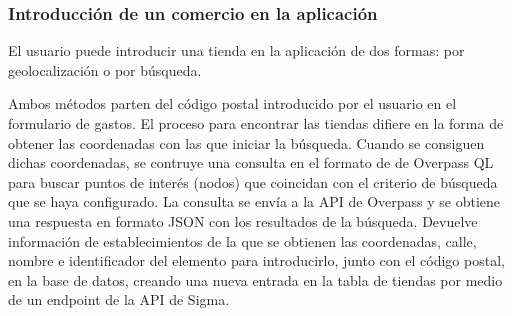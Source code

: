 \subsubsection{Introducción de un comercio en la aplicación}
El usuario puede introducir una tienda en la aplicación de dos formas: por geolocalización o por búsqueda.

Ambos métodos parten del código postal introducido por el usuario en el formulario de gastos. El proceso para encontrar las tiendas difiere en la forma de obtener las coordenadas con las que iniciar la búsqueda. Cuando se consiguen dichas coordenadas, se contruye una consulta en el formato de de Overpass QL para buscar puntos de interés (nodos) que coincidan con el criterio de búsqueda que se haya configurado. La consulta se envía a la API de Overpass y se obtiene una respuesta en formato JSON con los resultados de la búsqueda. Devuelve información de establecimientos de la que se obtienen las coordenadas, calle, nombre e identificador del elemento para introducirlo, junto con el código postal, en la base de datos, creando una nueva entrada en la tabla de tiendas por medio de un endpoint de la API de Sigma.

